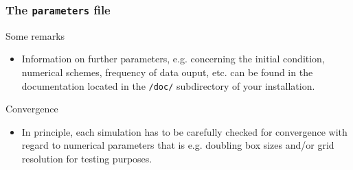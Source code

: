 \documentclass[10pt]{beamer}
\begin{document}
\begin{frame}[fragile]
  \frametitle{The {\tt parameters} file}

\begin{block}

\begin{exampleblock}{Some remarks}

\begin{itemize}
\item Information on further parameters, e.g. concerning the initial condition, 
numerical schemes, frequency of data ouput, etc. can be found in the \gene
documentation located in the {\tt /doc/} subdirectory of your \gene installation.
\end{itemize}
\end{exampleblock}

\begin{alertblock}{Convergence}

\begin{itemize}
\item In principle, each simulation has to be carefully checked for convergence with regard
to numerical parameters that is e.g. doubling box sizes and/or grid resolution for 
testing purposes.
\end{itemize}
\end{alertblock}

\end{block}

\end{frame}

\end{document}
